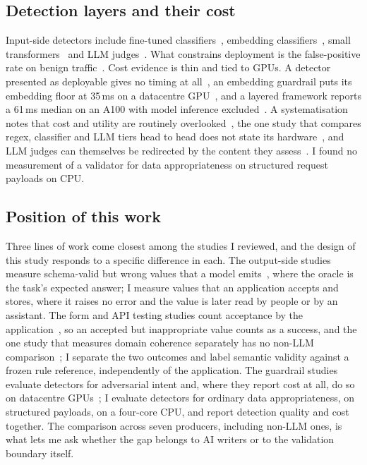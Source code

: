 \documentclass[conference]{IEEEtran}
\begin{document}
\subsection{Detection layers and their cost}
Input-side detectors include fine-tuned classifiers~\cite{jacob2025promptshield}, embedding
classifiers~\cite{ayub2024embedding,ahmed2026reflexguard}, small
transformers~\cite{datta2025javelinguard} and LLM judges~\cite{rebedea2023nemo}. What constrains deployment is the false-positive rate on
benign traffic~\cite{li2024injecguard}. Cost evidence is thin and tied to GPUs. A detector presented as
deployable gives no timing at all~\cite{jacob2025promptshield}, an embedding guardrail puts its
embedding floor at 35\,ms on a datacentre GPU~\cite{ahmed2026reflexguard}, and a layered framework
reports a 61\,ms median on an A100 with model inference excluded~\cite{saleem2026layered}. A systematisation notes
that cost and utility are routinely overlooked~\cite{wang2026sokguardrails}, the one study that
compares regex, classifier and LLM tiers head to head does not state its
hardware~\cite{maiorano2026tradeoffs}, and LLM judges can themselves be redirected by the content they
assess~\cite{shi2024judgeattack}. I found no measurement of a validator for data appropriateness on
structured request payloads on CPU.

\subsection{Position of this work}
Three lines of work come closest among the studies I reviewed, and the design of this study responds to
a specific difference in each. The output-side studies measure schema-valid but wrong values that a
model emits~\cite{li2026orderbench,ray2026constrainttax,singh2026sob,wrenn2026enterprise}, where the
oracle is the task's expected answer; I measure values that an application accepts and stores, where it
raises no error and the value is later read by people or by an assistant. The form and API testing
studies count acceptance by the application~\cite{alian2024formnexus,li2026webformtest}, so an accepted
but inappropriate value counts as a success, and the one study that measures domain coherence
separately has no non-LLM comparison~\cite{kim2025llamaresttest}; I separate the two outcomes and label
semantic validity against a frozen rule reference, independently of the application. The guardrail
studies evaluate detectors for adversarial intent and, where they report cost at all, do so on
datacentre GPUs~\cite{ahmed2026reflexguard,saleem2026layered}; I evaluate detectors for ordinary data
appropriateness, on structured payloads, on a four-core CPU, and report detection quality and cost
together. The comparison across seven producers, including non-LLM ones, is what lets me ask whether
the gap belongs to AI writers or to the validation boundary itself.
\end{document}

